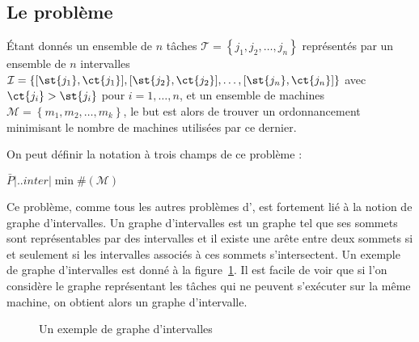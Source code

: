 \documentclass[a4paper,11pt]{article}
\begin{document}
\subsection{Le problème \bisched}

Étant donnés un ensemble de $n$ tâches $\mathcal{T} = \left\{
j_1, j_2, \dots, j_n \right\}$ représentés par un ensemble de $n$ intervalles $\mathcal{I} = \{
[ \st{j_1}, \ct{j_1} ], [ \st{j_2}, \ct{j_2} ], \dots, [ \st{j_n},
\ct{j_n} ] \}$ avec $\ct{j_i} > \st{j_i}$ pour $i = 1, \dots, n$, et un ensemble de
machines $\mathcal{M} = \left\{ m_1, m_2, \dots, m_k \right\}$, le but est alors de trouver un
ordonnancement minimisant le nombre de machines utilisées par ce dernier.

On peut définir la notation à trois champs de ce problème :
\begin{center}
    $\bar{P} \Big| . . inter \Big| \min \#(\mathcal{M})$
\end{center}

Ce problème, comme tous les autres problèmes d'\isched, est fortement lié à la notion de graphe
d'intervalles. Un graphe d'intervalles est un graphe tel que ses sommets sont représentables par
des intervalles et il existe une arête entre deux sommets si et seulement si les intervalles
associés à ces sommets s'intersectent. Un exemple de graphe d'intervalles est donné à la
figure~\ref{fig:ex_gint}. Il est facile de voir que si l'on considère le graphe représentant les
tâches qui ne peuvent s'exécuter sur la même machine, on obtient alors un graphe d'intervalle.

\begin{figure}
    \centering
    \caption{Un exemple de graphe d'intervalles}
    \label{fig:ex_gint}
\end{figure}
\end{document}
